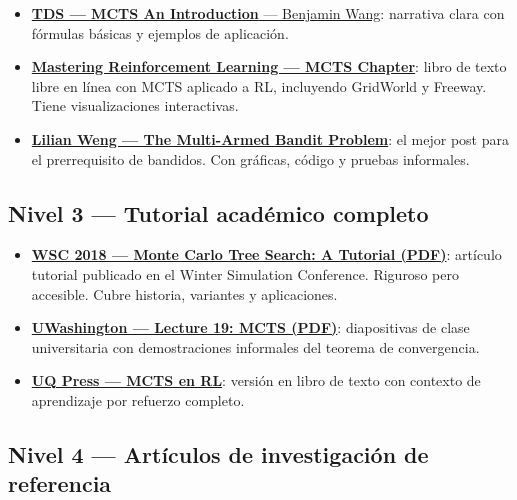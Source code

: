 \documentclass[12pt, a4paper]{article}
\begin{document}
\begin{itemize}
  \item \href{https://towardsdatascience.com/monte-carlo-tree-search-an-introduction-503d8c04e168/}%
    {\textbf{TDS — MCTS An Introduction} — Benjamin Wang}: narrativa clara con
    fórmulas básicas y ejemplos de aplicación.

  \item \href{https://gibberblot.github.io/rl-notes/single-agent/mcts.html}%
    {\textbf{Mastering Reinforcement Learning — MCTS Chapter}}: libro de texto
    libre en línea con MCTS aplicado a RL, incluyendo GridWorld y Freeway.
    Tiene visualizaciones interactivas.

  \item \href{https://lilianweng.github.io/posts/2018-01-23-multi-armed-bandit/}%
    {\textbf{Lilian Weng — The Multi-Armed Bandit Problem}}: el mejor post para
    el prerrequisito de bandidos. Con gráficas, código y pruebas informales.
\end{itemize}

\subsection*{Nivel 3 — Tutorial académico completo}

\begin{itemize}
  \item \href{https://www.informs-sim.org/wsc18papers/includes/files/021.pdf}%
    {\textbf{WSC 2018 — Monte Carlo Tree Search: A Tutorial (PDF)}}: artículo
    tutorial publicado en el Winter Simulation Conference. Riguroso pero
    accesible. Cubre historia, variantes y aplicaciones.

  \item \href{https://courses.cs.washington.edu/courses/cse599i/18wi/resources/lecture19/lecture19.pdf}%
    {\textbf{UWashington — Lecture 19: MCTS (PDF)}}: diapositivas de clase
    universitaria con demostraciones informales del teorema de convergencia.

  \item \href{https://uq.pressbooks.pub/mastering-reinforcement-learning/chapter/monte-carlo-tree-search/}%
    {\textbf{UQ Press — MCTS en RL}}: versión en libro de texto con contexto
    de aprendizaje por refuerzo completo.
\end{itemize}

\subsection*{Nivel 4 — Artículos de investigación de referencia}
\end{document}
